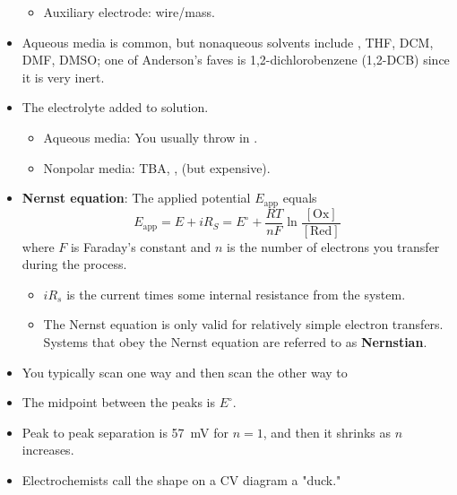\documentclass[../notes.tex]{subfiles}
\begin{document}
\begin{itemize}
\begin{itemize}
        \item Auxiliary electrode:  wire/mass.
    \end{itemize}
    \item Aqueous media is common, but nonaqueous solvents include , THF, DCM, DMF, DMSO; one of Anderson's faves is 1,2-dichlorobenzene (1,2-DCB) since it is very inert.
    \item The electrolyte added to solution.
    \begin{itemize}
        \item Aqueous media: You usually throw in .
        \item Nonpolar media: TBA, ,  (but expensive).
    \end{itemize}
    \item \textbf{Nernst equation}: The applied potential $E_\text{app}$ equals
    \begin{equation*}
        E_\text{app} = E+iR_S
        = E^\circ+\frac{RT}{nF}\ln\frac{[\text{Ox}]}{[\text{Red}]}
    \end{equation*}
    where $F$ is Faraday's constant and $n$ is the number of electrons you transfer during the process.
    \begin{itemize}
        \item $iR_s$ is the current times some internal resistance from the system.
        \item The Nernst equation is only valid for relatively simple electron transfers. Systems that obey the Nernst equation are referred to as \textbf{Nernstian}.
    \end{itemize}
    \item You typically scan one way and then scan the other way to 
    \item The midpoint between the peaks is $E^\circ$.
    \item Peak to peak separation is \SI{57}{\milli\volt} for $n=1$, and then it shrinks as $n$ increases.
    \item Electrochemists call the shape on a CV diagram a "duck."
\end{itemize}
\end{document}
